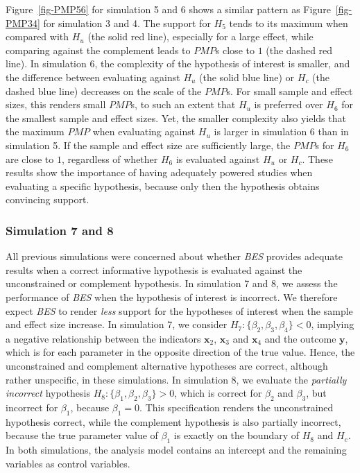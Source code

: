 \documentclass[
]{interact}
\begin{document}
Figure~\ref{fig-PMP56} for simulation 5 and 6 shows a similar pattern as
Figure~\ref{fig-PMP34} for simulation 3 and 4. The support for \(H_5\)
tends to its maximum when compared with \(H_u\) (the solid red line),
especially for a large effect, while comparing against the complement
leads to \(PMP\)s close to \(1\) (the dashed red line). In simulation 6,
the complexity of the hypothesis of interest is smaller, and the
difference between evaluating against \(H_u\) (the solid blue line) or
\(H_c\) (the dashed blue line) decreases on the scale of the \(PMP\)s.
For small sample and effect sizes, this renders small \(PMP\)s, to such
an extent that \(H_u\) is preferred over \(H_6\) for the smallest sample
and effect sizes. Yet, the smaller complexity also yields that the
maximum \(PMP\) when evaluating against \(H_u\) is larger in simulation
6 than in simulation 5. If the sample and effect size are sufficiently
large, the \(PMP\)s for \(H_6\) are close to \(1\), regardless of
whether \(H_6\) is evaluated against \(H_u\) or \(H_c\). These results
show the importance of having adequately powered studies when evaluating
a specific hypothesis, because only then the hypothesis obtains
convincing support.

\hypertarget{simulation-7-and-8}{%
\subsubsection{Simulation 7 and 8}\label{simulation-7-and-8}}

All previous simulations were concerned about whether \emph{BES}
provides adequate results when a correct informative hypothesis is
evaluated against the unconstrained or complement hypothesis. In
simulation 7 and 8, we assess the performance of \emph{BES} when the
hypothesis of interest is incorrect. We therefore expect \emph{BES} to
render \emph{less} support for the hypotheses of interest when the
sample and effect size increase. In simulation 7, we consider
\(H_7: \{\beta_2, \beta_3, \beta_4\} < 0\), implying a negative
relationship between the indicators \(\boldsymbol{x}_2\),
\(\boldsymbol{x}_3\) and \(\boldsymbol{x}_4\) and the outcome
\(\boldsymbol{y}\), which is for each parameter in the opposite
direction of the true value. Hence, the unconstrained and complement
alternative hypotheses are correct, although rather unspecific, in these
simulations. In simulation 8, we evaluate the \emph{partially incorrect}
hypothesis \(H_8: \{\beta_1, \beta_2, \beta_3\} > 0\), which is correct
for \(\beta_2\) and \(\beta_3\), but incorrect for \(\beta_1\), because
\(\beta_1 = 0\). This specification renders the unconstrained hypothesis
correct, while the complement hypothesis is also partially incorrect,
because the true parameter value of \(\beta_1\) is exactly on the
boundary of \(H_8\) and \(H_c\). In both simulations, the analysis model
contains an intercept and the remaining variables as control variables.
\end{document}
